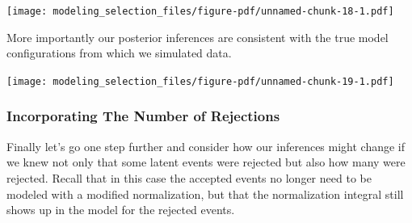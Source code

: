 \documentclass[
  letterpaper,
  DIV=11,
  numbers=noendperiod]{scrartcl}
\newenvironment{Shaded}{\begin{snugshade}}{\end{snugshade}}
\newcommand{\AttributeTok}[1]{\textcolor[rgb]{0.40,0.45,0.13}{#1}}
\newcommand{\DecValTok}[1]{\textcolor[rgb]{0.68,0.00,0.00}{#1}}
\newcommand{\FloatTok}[1]{\textcolor[rgb]{0.68,0.00,0.00}{#1}}
\newcommand{\FunctionTok}[1]{\textcolor[rgb]{0.28,0.35,0.67}{#1}}
\newcommand{\NormalTok}[1]{\textcolor[rgb]{0.00,0.23,0.31}{#1}}
\newcommand{\SpecialCharTok}[1]{\textcolor[rgb]{0.37,0.37,0.37}{#1}}
\newcommand{\StringTok}[1]{\textcolor[rgb]{0.13,0.47,0.30}{#1}}
\begin{document}
\texttt{[image: modeling\_selection\_files/figure-pdf/unnamed-chunk-18-1.pdf]}

More importantly our posterior inferences are consistent with the true
model configurations from which we simulated data.

\begin{Shaded}
\end{Shaded}

\texttt{[image: modeling\_selection\_files/figure-pdf/unnamed-chunk-19-1.pdf]}

\subsubsection{Incorporating The Number of
Rejections}\label{incorporating-the-number-of-rejections}

Finally let's go one step further and consider how our inferences might
change if we knew not only that some latent events were rejected but
also how many were rejected. Recall that in this case the accepted
events no longer need to be modeled with a modified normalization, but
that the normalization integral still shows up in the model for the
rejected events.
\end{document}
